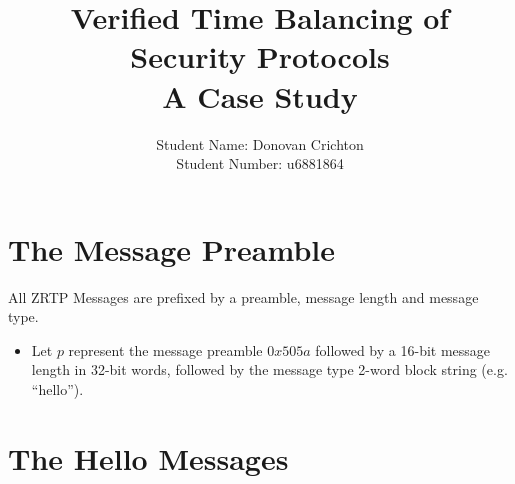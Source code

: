 \documentclass[11pt]{article}
\title{Verified Time Balancing of Security Protocols 
  \\ \large A Case Study}
\author{Student Name: Donovan Crichton\\
Student Number: u6881864}
\date{}
\begin{document}
\maketitle
  \section{The Message Preamble}
  All ZRTP Messages are prefixed by a preamble, message length
  and message type. 
  \begin{itemize}
  \item Let $p$ represent the message preamble $0x505a$ followed
        by a 16-bit message length in 32-bit words, followed by the 
        message type 2-word block string (e.g. ``hello'').
  \end{itemize}
  \section{The Hello Messages}
\end{document}
